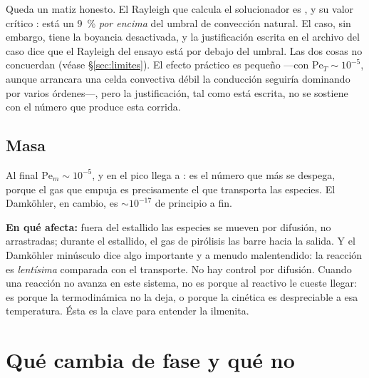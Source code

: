 \documentclass[11pt,a4paper]{article}
\begin{document}
Queda un matiz honesto. El Rayleigh que calcula el solucionador es
\datRa{}, y su valor crítico
\datRaCritico{}: está un \SI{9}{\percent} \emph{por
encima} del umbral de convección natural. El caso, sin embargo, tiene la
boyancia desactivada, y la justificación escrita en el archivo del caso dice
que el Rayleigh del ensayo está por debajo del umbral. Las dos cosas no
concuerdan (véase §\ref{sec:limites}). El efecto práctico es pequeño ---con
$\mathrm{Pe}_T \sim 10^{-5}$, aunque arrancara una celda convectiva débil la
conducción seguiría dominando por varios órdenes---, pero la justificación, tal
como está escrita, no se sostiene con el número que produce esta corrida.

\subsection{Masa}

Al final $\mathrm{Pe}_m \sim 10^{-5}$, y en el pico llega a
\datPeMasicoMax{}: es el número que más se despega, porque el gas que empuja es
precisamente el que transporta las especies. El Damköhler, en cambio, es
$\sim 10^{-17}$ de principio a fin.

\textbf{En qué afecta:} fuera del estallido las especies se mueven por difusión,
no arrastradas; durante el estallido, el gas de pirólisis las barre hacia la
salida. Y el Damköhler minúsculo dice algo importante y a menudo malentendido: la
reacción es \emph{lentísima} comparada con el transporte. No hay control por
difusión. Cuando una reacción no avanza en este sistema, no es porque al
reactivo le cueste llegar: es porque la termodinámica no la deja, o porque la
cinética es despreciable a esa temperatura. Ésta es la clave para entender la
ilmenita.

\section{Qué cambia de fase y qué no}

\begin{table}[H]\centering\small
\caption{Inventario de fases sólidas al principio y al final. La columna de
resultado sale de comparar las dos masas, no de una expectativa: «no cambia»
significa que la variación queda por debajo de una parte en cien mil, o de
\SI{0.1}{\micro\gram} en términos absolutos. Ambos umbrales están muy por
debajo de lo que vería una balanza.}

\end{table}
\end{document}
